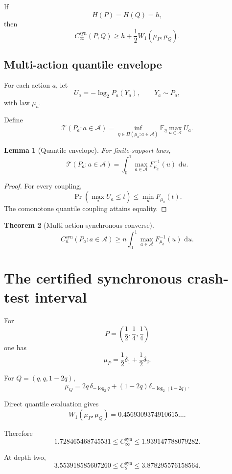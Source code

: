 \documentclass[11pt,a4paper]{article}
\newtheorem{theorem}{Theorem}[section]
\newtheorem{lemma}[theorem]{Lemma}
\newcommand{\Csyn}{C^{\mathrm{syn}}}
\newcommand{\CinfSyn}{C_{\infty}^{\mathrm{syn}}}
\newcommand{\cA}{\mathcal A}
\newcommand{\E}{\mathbb E}
\newcommand{\1}{\mathbf 1}
\newcommand{\dd}{\,\mathrm d}
\begin{document}
If
\[
H(P)=H(Q)=h,
\]
then
\[
\boxed{
\CinfSyn(P,Q)
\ge
h+\frac12W_1(\mu_P,\mu_Q).
}
\tag{9.6}
\]


\subsection{Multi-action quantile envelope}

For each action \(a\), let
\[
U_a=-\log_2P_a(Y_a),
\qquad
Y_a\sim P_a,
\]
with law \(\mu_a\).

Define
\[
\mathcal T(P_a:a\in\cA)
=
\inf_{\eta\in\Pi(\mu_a:a\in\cA)}
\E_\eta\max_{a\in\cA}U_a.
\tag{9.7}
\]

\begin{lemma}[Quantile envelope]
For finite-support laws,
\[
\boxed{
\mathcal T(P_a:a\in\cA)
=
\int_0^1
\max_{a\in\cA}
F_{\mu_a}^{-1}(u)\,\dd u.
}
\tag{9.8}
\]
\end{lemma}

\begin{proof}
For every coupling,
\[
\Pr(\max_aU_a\le t)
\le
\min_aF_{\mu_a}(t).
\]
The comonotone quantile coupling attains equality.
\end{proof}

\begin{theorem}[Multi-action synchronous converse]
\[
\boxed{
\Csyn_n(P_a:a\in\cA)
\ge
n
\int_0^1
\max_{a\in\cA}
F_{\mu_a}^{-1}(u)\,\dd u.
}
\tag{9.9}
\]
\end{theorem}


\section{The certified synchronous crash-test interval}

For
\[
P=\left(\frac12,\frac14,\frac14\right)
\]
one has
\[
\mu_P
=
\frac12\delta_1+\frac12\delta_2.
\tag{10.1}
\]

For \(Q=(q,q,1-2q)\),
\[
\mu_Q
=
2q\,\delta_{-\log_2q}
+
(1-2q)\delta_{-\log_2(1-2q)}.
\tag{10.2}
\]

Direct quantile evaluation gives
\[
W_1(\mu_P,\mu_Q)
=
0.4569309374910615\ldots.
\tag{10.3}
\]

Therefore
\[
\boxed{
1.728465468745531
\le
\CinfSyn
\le
1.939147788079282.
}
\tag{10.4}
\]

At depth two,
\[
3.553918585607260
\le
\Csyn_2
\le
3.878295576158564.
\tag{10.5}
\]
\end{document}
